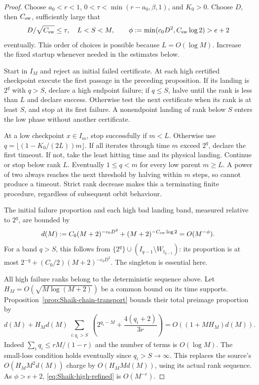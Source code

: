 \begin{proof}
Choose \(a_0<r<1\), \(0<\tau<\min(r-a_0,\beta,1)\), and \(K_0>0\).
Choose \(D\), then \(C_{\rm sw}\), sufficiently large that
\[
 D/\sqrt{C_{\rm sw}}\le\tau,\quad L<S<M,\qquad
 \phi:=\min(c_0D^2,C_{\rm sw}\log2)>e+2
\]
eventually. This order of choices is possible because \(L=O(\log M)\).
Increase the fixed startup whenever needed in the estimates below.

Start in \(I_M\) and reject an initial failed certificate. At each high
certified checkpoint execute the first passage in the preceding
proposition. If its landing is \(2^q\) with \(q>S\), declare a high
endpoint failure; if \(q\le S\), halve until the rank is less than \(L\)
and declare success. Otherwise test the next certificate when its rank
is at least \(S\), and stop at its first failure. A nonendpoint landing
of rank below \(S\) enters the low phase without another certificate.

At a low checkpoint \(x\in I_m\), stop successfully if \(m<L\).
Otherwise use \(q=\lfloor(1-K_0/(2L))m\rfloor\). If all iterates through
time \(m\) exceed \(2^q\), declare the first timeout. If not, take the
least hitting time and its physical landing. Continue or stop below
rank \(L\). Eventually \(1\le q<m\) for every low parent \(m\ge L\).
A power of two always reaches the next threshold by halving within
\(m\) steps, so cannot produce a timeout. Strict rank decrease makes
this a terminating finite procedure, regardless of subsequent orbit
behaviour.

The initial failure proportion and each high bad landing band, measured
relative to \(2^q\), are bounded by
\[
 d(M):=C_0(M+2)^{-c_0D^2}+(M+2)^{-C_{\rm sw}\log2}
 =O(M^{-\phi}).
\]
For a band \(q>S\), this follows from
\(\{2^q\}\cup(I_{q-1}\setminus W_{t_{q-1}})\):
its proportion is at most
\(2^{-q}+(C_0/2)(M+2)^{-c_0D^2}\).
The singleton is essential here.

All high failure ranks belong to the deterministic sequence above.
Let \(H_M=O(\sqrt{M\log(M+2)})\) be a common bound on its time
supports. Proposition~\ref{prop:Shaik-chain-transport} bounds their
total preimage proportion by
\begin{equation}\label{eq:Shaik-high-refined}
 d(M)+H_Md(M)
 \sum_{\substack{i:q_i>S}}
 \left(2^{q_i-M}+\frac{4(q_i+2)}{3r}\right)
 =O((1+M H_M)d(M)).
\end{equation}
Indeed \(\sum_iq_i\le rM/(1-r)\) and the number of terms is \(O(\log M)\).
The small-loss condition holds eventually since \(q_i>S\to\infty\).
This replaces the source's \(O(H_M M^2d(M))\) charge by
\(O(H_M M d(M))\), using its actual rank sequence.
As \(\phi>e+2\), \eqref{eq:Shaik-high-refined} is \(O(M^{-e})\).


\end{proof}
